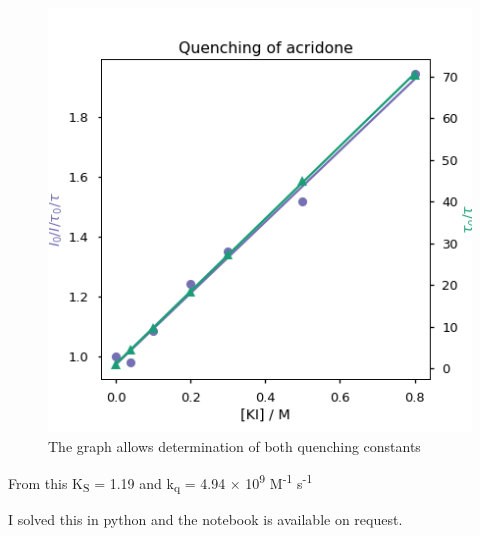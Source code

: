 \documentclass[
]{book}
\begin{document}
\begin{figure}

{\centering \includegraphics[width=0.7\linewidth]{images/acridonequench} 

}

\caption{The graph allows determination of both quenching constants}\label{fig:acridonequench}
\end{figure}

From this K\textsubscript{S} = 1.19 and k\textsubscript{q} = 4.94 × 10\textsuperscript{9} M\textsuperscript{-1} s\textsuperscript{-1}

I solved this in python and the notebook is available on request.

  
\end{document}
